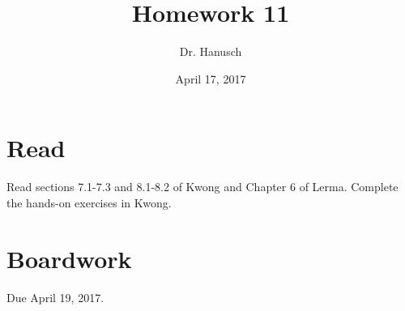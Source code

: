 \documentclass[12pt]{article}
\title{Homework 11}
\author{Dr. Hanusch}  %
\date{April 17, 2017}
\begin{document}
\newtheorem{thm}{Theorem}
\newtheorem{cor}[thm]{Corollary}
\newtheorem{lem}[thm]{Lemma}
\newtheorem{prop}[thm]{Proposition}
\theoremstyle{definition}
\newtheorem{defn}[thm]{Definition}
\newtheorem{qu}[]{Question}
\theoremstyle{remark}
\newtheorem{rem}[thm]{Remark}
\newtheorem*{prf}{Proof}

\newcommand{\norm}[1]{\left\Vert#1\right\Vert}
\newcommand{\abs}[1]{\left\vert#1\right\vert}
\newcommand{\set}[1]{\left\{#1\right\}}
\newcommand{\Real}{\mathbb R}
\newcommand{\Z}{\mathbb Z}
\newcommand{\N}{\mathbb N}
\newcommand{\eps}{\varepsilon}
\newcommand{\To}{\longrightarrow}
\newcommand{\BX}{\mathbf{B}(X)}
\newcommand{\A}{\mathcal{A}}
\newcommand{\U}{\mathcal{U}}
\newcommand{\power}{\mathscr{P}}
\newcommand{\dv}{\textrm{ div }}




\maketitle

\section{Read}

Read sections 7.1-7.3 and 8.1-8.2 of Kwong and Chapter 6 of Lerma. Complete the hands-on exercises in Kwong.

\section{Boardwork} 

Due April 19, 2017.

\end{document}
